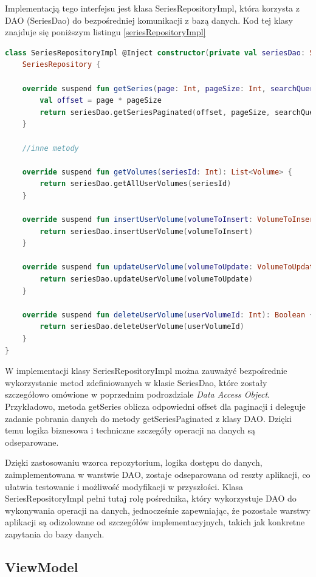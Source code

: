 \documentclass[12pt,twoside]{article}
\begin{document}
Implementacją tego interfejsu jest klasa SeriesRepositoryImpl, która korzysta z DAO (SeriesDao) do bezpośredniej 
komunikacji z bazą danych. Kod tej klasy znajduje się poniższym listingu \ref{seriesRepositoryImpl}
\begin{lstlisting}[language=Kotlin,caption=Interfejs SeriesRepository, label={seriesRepositoryImpl}]
class SeriesRepositoryImpl @Inject constructor(private val seriesDao: SeriesDao) :
    SeriesRepository {

    override suspend fun getSeries(page: Int, pageSize: Int, searchQuery: String): List<Series> {
        val offset = page * pageSize
        return seriesDao.getSeriesPaginated(offset, pageSize, searchQuery)
    }

	//inne metody

	override suspend fun getVolumes(seriesId: Int): List<Volume> {
        return seriesDao.getAllUserVolumes(seriesId)
    }

	override suspend fun insertUserVolume(volumeToInsert: VolumeToInsert): Int? {
        return seriesDao.insertUserVolume(volumeToInsert)
    }

    override suspend fun updateUserVolume(volumeToUpdate: VolumeToUpdate): Boolean {
        return seriesDao.updateUserVolume(volumeToUpdate)
    }

    override suspend fun deleteUserVolume(userVolumeId: Int): Boolean {
        return seriesDao.deleteUserVolume(userVolumeId)
    }
}
\end{lstlisting}
W implementacji klasy SeriesRepositoryImpl można zauważyć bezpośrednie wykorzystanie metod zdefiniowanych w klasie 
SeriesDao, które zostały szczegółowo omówione w poprzednim podrozdziale \textit{Data Access Object}. Przykładowo, 
metoda getSeries oblicza odpowiedni offset dla paginacji i deleguje zadanie pobrania danych do metody 
getSeriesPaginated z klasy DAO. Dzięki temu logika biznesowa i techniczne szczegóły operacji na danych są 
odseparowane.

Dzięki zastosowaniu wzorca repozytorium, logika dostępu do danych, zaimplementowana w warstwie DAO, zostaje 
odseparowana od reszty aplikacji, co ułatwia testowanie i możliwość modyfikacji w przyszłości. Klasa 
SeriesRepositoryImpl pełni tutaj rolę pośrednika, który wykorzystuje DAO do wykonywania operacji na danych, 
jednocześnie zapewniając, że pozostałe warstwy aplikacji są odizolowane od szczegółów implementacyjnych, takich jak 
konkretne zapytania do bazy danych.

\subsection{ViewModel}
\end{document}
